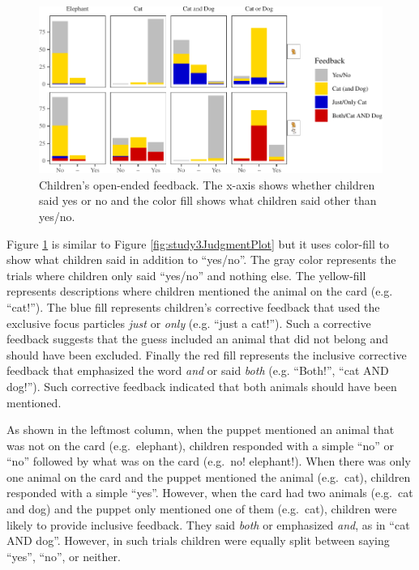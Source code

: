 \documentclass[man]{apa6}
\theoremstyle{definition}
\theoremstyle{definition}
\theoremstyle{definition}
\theoremstyle{remark}
\begin{document}
\begin{figure}[t]

{\centering \includegraphics{figs/feedbackFillPlot-1} 

}

\caption{Children's open-ended feedback. The x-axis shows whether children said yes or no and the color fill shows what children said other than yes/no.}\label{fig:feedbackFillPlot}
\end{figure}

Figure \ref{fig:feedbackFillPlot} is similar to Figure
\ref{fig:study3JudgmentPlot} but it uses color-fill to show what
children said in addition to \enquote{yes/no}. The gray color represents
the trials where children only said \enquote{yes/no} and nothing else.
The yellow-fill represents descriptions where children mentioned the
animal on the card (e.g. \enquote{cat!}). The blue fill represents
children's corrective feedback that used the exclusive focus particles
\emph{just} or \emph{only} (e.g. \enquote{just a cat!}). Such a
corrective feedback suggests that the guess included an animal that did
not belong and should have been excluded. Finally the red fill
represents the inclusive corrective feedback that emphasized the word
\emph{and} or said \emph{both} (e.g. \enquote{Both!}, \enquote{cat AND
dog!}). Such corrective feedback indicated that both animals should have
been mentioned.

As shown in the leftmost column, when the puppet mentioned an animal
that was not on the card (e.g.~elephant), children responded with a
simple \enquote{no} or \enquote{no} followed by what was on the card
(e.g.~no! elephant!). When there was only one animal on the card and the
puppet mentioned the animal (e.g.~cat), children responded with a simple
\enquote{yes}. However, when the card had two animals (e.g.~cat and dog)
and the puppet only mentioned one of them (e.g.~cat), children were
likely to provide inclusive feedback. They said \emph{both} or
emphasized \emph{and}, as in \enquote{cat AND dog}. However, in such
trials children were equally split between saying \enquote{yes},
\enquote{no}, or neither.
\end{document}
